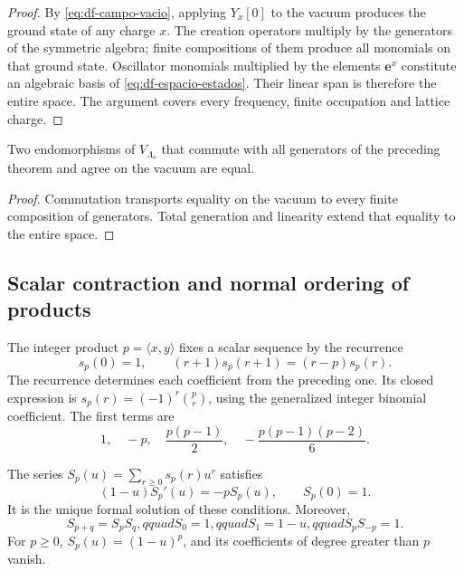 \begin{proof}
By \eqref{eq:df-campo-vacio}, applying \(Y_x[0]\) to the vacuum produces the ground state of any charge \(x\). The creation operators multiply by the generators of the symmetric algebra; finite compositions of them produce all monomials on that ground state. Oscillator monomials multiplied by the elements \(\mathbf e^x\) constitute an algebraic basis of \eqref{eq:df-espacio-estados}. Their linear span is therefore the entire space. The argument covers every frequency, finite occupation and lattice charge.
\end{proof}

\begin{corollary}
Two endomorphisms of \(V_{\Lambda_o}\) that commute with all generators of the preceding theorem and agree on the vacuum are equal.
\end{corollary}

\begin{proof}
Commutation transports equality on the vacuum to every finite composition of generators. Total generation and linearity extend that equality to the entire space.
\end{proof}

\subsection{Scalar contraction and normal ordering of products}
\label{subsec:df-contraccion}


The integer product \(p=\langle x,y\rangle\) fixes a scalar sequence by the recurrence
\begin{equation}
 s_p(0)=1,\qquad
 (r+1)s_p(r+1)=(r-p)s_p(r).
 \label{eq:df-contraccion-recurrencia}
\end{equation}
The recurrence determines each coefficient from the preceding one. Its closed expression is \(s_p(r)=(-1)^r\binom pr\), using the generalized integer binomial coefficient. The first terms are
\[
 1,\quad -p,\quad \frac{p(p-1)}2,\quad
 -\frac{p(p-1)(p-2)}6.
\]

\begin{proposition}
\label{prop:df-factor-contraccion} The series \(S_p(u)=\sum_{r\geq0}s_p(r)u^r\) satisfies
\begin{equation}
 (1-u)S_p'(u)=-pS_p(u),\qquad S_p(0)=1.
 \label{eq:df-ecuacion-factor}
\end{equation}
It is the unique formal solution of these conditions. Moreover,
\[
 S_{p+q}=S_pS_q,qquad S_0=1,qquad S_1=1-u,qquad
 S_pS_{-p}=1.
\]
For \(p\geq0\), \(S_p(u)=(1-u)^p\), and its coefficients of degree greater than \(p\) vanish.
\end{proposition}

